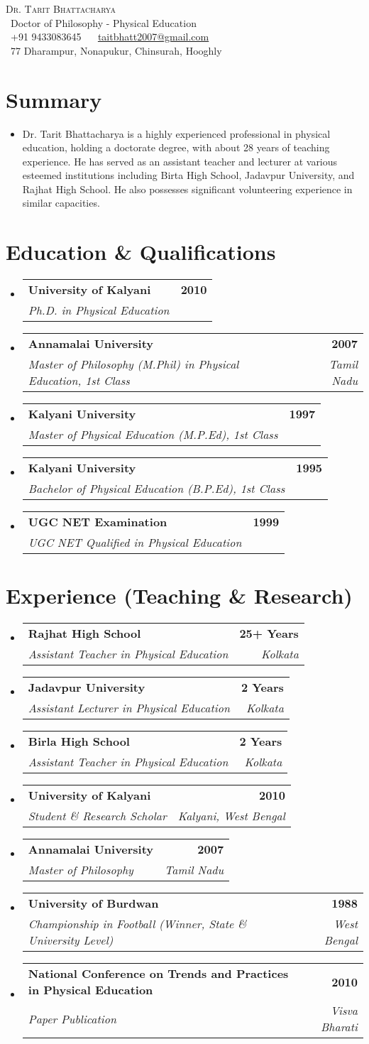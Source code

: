 \documentclass[letterpaper,11pt]{article}
\makeatletter
\newcommand{\resumeItem}[1]{\item\small{{#1 \vspace{0pt}}}}
\newcommand{\resumeSubheading}[4]{
  \vspace{-2pt}\item
    \begin{tabular*}{1.0\textwidth}[t]{l@{\extracolsep{\fill}}r}
      \textbf{#1} & \textbf{\small #2} \\
      \textit{\small#3} & \textit{\small #4} \\
    \end{tabular*}\vspace{-7pt}
}
\newcommand{\resumeSubHeadingListStart}{\begin{itemize}[leftmargin=0.0in, label={}]}
\newcommand{\resumeSubHeadingListEnd}{\end{itemize}\vspace{0pt}}
\makeatother
\begin{document}
\begin{center}
    {\Large \scshape Dr. Tarit Bhattacharya} \\[2mm]
    \faGraduationCap\ Doctor of Philosophy - Physical Education \\[2mm]
    \faPhone\ +91 9433083645 ~ 
    \faEnvelope\ \href{mailto:taitbhatt2007@gmail.com}{taitbhatt2007@gmail.com} \\
    \faMapMarker\ 77 Dharampur, Nonapukur, Chinsurah, Hooghly 
    \vspace{-8pt}
\end{center}

\section{Summary}
  \resumeSubHeadingListStart
    \resumeItem{Dr. Tarit Bhattacharya is a highly experienced professional in physical education, holding a doctorate degree, with about 28 years of teaching experience. He has served as an assistant teacher and lecturer at various esteemed institutions including Birta High School, Jadavpur University, and Rajhat High School. He also possesses significant volunteering experience in similar capacities.}
  \resumeSubHeadingListEnd

\section{Education \& Qualifications}
  \resumeSubHeadingListStart
    \resumeSubheading
      {University of Kalyani}{2010}
      {Ph.D. in Physical Education}{}
    \resumeSubheading
      {Annamalai University}{2007}
      {Master of Philosophy (M.Phil) in Physical Education, 1st Class}{Tamil Nadu}
    \resumeSubheading
      {Kalyani University}{1997}
      {Master of Physical Education (M.P.Ed), 1st Class}{}
    \resumeSubheading
      {Kalyani University}{1995}
      {Bachelor of Physical Education (B.P.Ed), 1st Class}{}
    \resumeSubheading
      {UGC NET Examination}{1999}
      {UGC NET Qualified in Physical Education}{}
  \resumeSubHeadingListEnd

\section{Experience (Teaching \& Research)}
  \resumeSubHeadingListStart
    \resumeSubheading{Rajhat High School}{25+ Years}
      {Assistant Teacher in Physical Education}{Kolkata}
    \resumeSubheading{Jadavpur University}{2 Years}
      {Assistant Lecturer in Physical Education}{Kolkata}
    \resumeSubheading{Birla High School}{2 Years}
      {Assistant Teacher in Physical Education}{Kolkata}
    \resumeSubheading{University of Kalyani}{2010}
      {Student \& Research Scholar}{Kalyani, West Bengal}
    \resumeSubheading{Annamalai University}{2007}
      {Master of Philosophy}{Tamil Nadu}
    \resumeSubheading{University of Burdwan}{1988}
      {Championship in Football (Winner, State \& University Level)}{West Bengal}
    \resumeSubheading{National Conference on Trends and Practices in Physical Education}{2010}
      {Paper Publication}{Visva Bharati}
  \resumeSubHeadingListEnd
\end{document}
